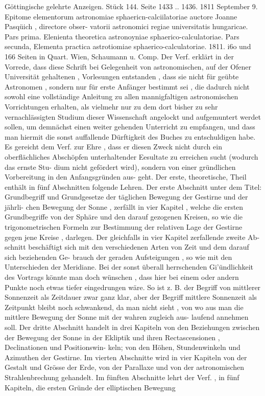 \documentclass[12pt,a4paper]{article}
\begin{document}
Göttingische  gelehrte  Anzeigen.     Stück  144.     Seite  1433 ..  1436.     1811  September  9. Epitome  elementorum  astronomiae  sphaericn-calciilatoriae  auctore  Joanne  Pasqüich  ,  directore  obser- vatorii  astronomici  regiae  universitatis  hungaricae.  Pars  prima.  Elenienta  theoretica  astronoyniae sphaerico-calculatoriae.  Pars  secunda,  Elementa  practica  astrotiomiae  sphaerico-calculatoriae.  1811.  i6o und  166  Seiten  in  Quart.     Wien,  Schaumann  u.  Comp. Der  Verf.  erklärt  in  der  Vorrede,  dass  diese  Schrift  bei  Gelegenheit  von  astronomischen,  auf  der Ofener  Universität  gehaltenen ,  Vorlesungen  entstanden ,  dass  sie  nicht  für  geübte  Astronomen ,  sondern nur  für  erste  Anfänger  bestimmt  sei ,  die  dadurch  nicht  sowohl  eine  vollständige  Anleitung  zu  allen mannigfaltigen  astronomischen  Vorrichtungen  erhalten,  als  vielmehr  nur  zu  dem  dort  bisher  zu  sehr vernachlässigten  Studium  dieser  Wissenschaft  angelockt  und  aufgemuntert  werdet  sollen,  um  demnächst einen  weiter  gehenden  Unterricht  zu  empfangen,  und  dass  man  hiermit  die  sonst  auffallende  Dürftigkeit des  Buches  zu  entschuldigen  habe.  Es  gereicht  dem  Verf.  zur  Ehre ,  dass  er  diesen  Zweck  nicht  durch ein  oberflächliches  Abschöpfen  unterhaltender  Eesultate  zu  erreichen  sucht  (wodurch  das  ernste  Stu- dium nicht  gefördert  wird),  sondern  von  einer  gründlichen  Vorbereitung  in  den  Anfangsgründen  aus- geht. Der  erste,  theoretische,  Theil  enthält  in  fünf  Abschnitten  folgende  Lehren.  Der  erste  Abschnitt unter  dem  Titel:  Grundbegriff  und  Grundgesetze  der  täglichen  Bewegung  der  Gestirne  und  der  jährli- chen Bewegung  der  Sonne ,  zerfällt  in  vier  Kapitel ,  welche  die  ersten  Grundbegriffe  von  der  Sphäre und  den  darauf  gezogenen  Kreisen,  so  wie  die  trigonometrischen  Formeln  zur  Bestimmung  der  relativen Lage  der  Gestirne  gegen  jene  Kreise ,  darlegen.  Der  gleichfalls  in  vier  Kapitel  zerfallende  zweite  Ab- schnitt beschäftigt  sich  mit  den  verschiedenen  Arten  von  Zeit  und  dem  darauf  sich  beziehenden  Ge- brauch der  geraden  Aufsteigungen ,  so  wie  mit  den  Unterschieden  der  Meridiane.  Bei  der  sonst  überall herrschenden  Gi'ündlichkeit  des  Vortrags  könnte  man  doch  wünschen ,  dass  hier  bei  einem  oder  andern Punkte  noch  etwas  tiefer  eingedrungen  wäre.  So  ist  z.  B.  der  Begriff  von  mittlerer  Sonnenzeit  als Zeitdauer  zwar  ganz  klar,  aber  der  Begriff  mittlere  Sonnenzeit  als  Zeitpunkt  bleibt  noch  schwankend, da  man  nicht  sieht ,  von  wo  aus  man  die  mittlere  Bewegung  der  Sonne  mit  der  wahren  zugleich  aus- laufend annehmen  soll.  Der  dritte  Abschnitt  handelt  in  drei  Kapiteln  von  den  Beziehungen  zwischen der  Bewegung  der  Sonne  in  der  Ekliptik  und  ihren  Rectascensionen ,  Declinationen  und  Positionswin- keln; von  den  Höhen,  Stundenwinkeln  und  Azimuthen  der  Gestirne.  Im  vierten  Abschnitte  wird  in vier  Kapiteln  von  der  Gestalt  und  Grösse  der  Erde,  von  der  Parallaxe  und  von  der  astronomischen Strahlenbrechung  gehandelt.  Im  fünften  Abschnitte  lehrt  der  Verf. ,  in  fünf  Kapiteln,  die  ersten  Gründe der  elliptischen  Bewegung  
\end{document}
